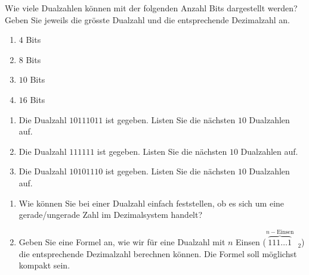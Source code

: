 \begin{exercise}
Wie viele Dualzahlen können mit der folgenden Anzahl Bits dargestellt werden? Geben Sie jeweils die grösste Dualzahl und die entsprechende Dezimalzahl an.

\begin{enumerate}
\item $4$ Bits
\fillwithgrid{0.5in}
\item $8$ Bits
\fillwithgrid{0.5in}
\item $10$ Bits
\fillwithgrid{0.5in}
\item $16$ Bits
\fillwithgrid{0.5in}
\end{enumerate}
\end{exercise}

\begin{exercise}
\begin{enumerate}
\item Die Dualzahl $10111011$ ist gegeben. Listen Sie die nächsten $10$ Dualzahlen auf.
\fillwithgrid{1.25in}
\item Die Dualzahl $111111$ ist gegeben. Listen Sie die nächsten $10$ Dualzahlen auf.
\fillwithgrid{1.25in}
\item Die Dualzahl $10101110$ ist gegeben. Listen Sie die nächsten $10$ Dualzahlen auf.
\fillwithgrid{1.25in}
\end{enumerate}
\end{exercise}

\begin{exercise}
\begin{enumerate}
\item Wie können Sie bei einer Dualzahl einfach feststellen, ob es sich um eine gerade/ungerade Zahl im Dezimalsystem handelt?
\fillwithgrid{0.5in}
\item Geben Sie eine Formel an, wie wir für eine Dualzahl mit $n$ Einsen ($\overbrace{111\dots1}^{n-\textrm{Einsen}}$~$_2$) die entsprechende Dezimalzahl berechnen können. Die Formel soll möglichst kompakt sein.
\end{enumerate}
\end{exercise}